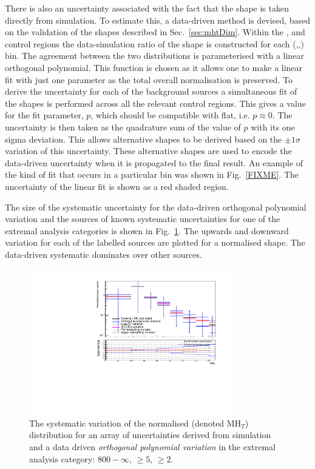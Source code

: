 There is also an uncertainty associated with the fact that the \MHT shape
is taken directly from simulation. To estimate this, a data-driven
method is devised, based on the validation of the \MHT shapes
described in Sec.~\ref{sec:mhtDim}. Within the \mj, \mmj and \gj
control regions the data-simulation ratio of the \MHT shape is
constructed for each (\HT,\nj,\nb) bin. The agreement between the two
distributions is parameterised with a linear orthogonal polynomial.
This function is chosen as it allows one to make a linear fit with
just one parameter as the total overall normalisation is preserved.
To derive the uncertainty for each of the background sources
a simultaneous fit of the \MHT shapes is performed across
all the relevant control regions. This gives a value for the fit
parameter, $p$, which should be compatible with flat, i.e.
$p\approx0$. The uncertainty is then taken as the quadrature sum of
the value of $p$ with its one sigma deviation. This allows alternative
\MHT shapes to be derived based on the $\pm 1\sigma$ variation of this
uncertainty. These alternative shapes are used to encode the
data-driven uncertainty when it is propagated to the final result. An
example of the kind of fit that occurs in a particular bin was shown
in Fig.~\ref{FIXME}. The uncertainty of the linear fit is shown as a red
shaded region.

The size of the systematic uncertainty for the data-driven orthogonal
polynomial variation and the sources of known systematic uncertainties
for one of the extremal analysis categories is shown in
Fig.~\ref{fig:mcCompLow}.
The upwards and downward variation for each of the labelled sources
are plotted for a normalised \MHT shape. The data-driven systematic
dominates over other sources.

\begin{figure}[h!]
  \centering
  \includegraphics[width=0.8\textwidth]{figs/analysis/mhtShape/totalSMS-T1tttt_mGluino-1000_mLSP-100_25ns_mht_ge5j_ge3b_800.pdf}
  \caption{The systematic variation of the normalised \MHT (denoted MH$_T$)
  distribution for an array of uncertainties derived from simulation
  and a data driven \emph{orthogonal polynomial variation} in the
  extremal analysis category: \scalht $800-\infty$, \njet $\geq 5$, \nb $\geq 2$.}
  \label{fig:mcCompLow}
\end{figure}

